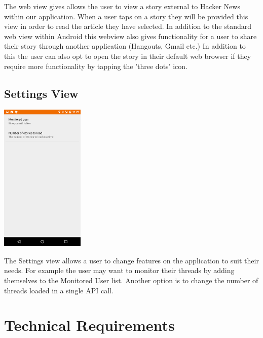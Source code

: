 \documentclass[11pt]{article}
\begin{document}
The web view gives allows the user to view a story external to Hacker News within our application. When a user taps on a story they will be provided this view in order to read the article they have selected. In addition to the standard web view within Android this webview also gives functionality for a user to share their story through another application (Hangouts, Gmail etc.) In addition to this the user can also opt to open the story in their default web browser if they require more functionality by tapping the 'three dots' icon.

\subsection*{Settings View}

\begin{center}
\includegraphics[width=0.3\textwidth]{settings.png}
\end{center}

The Settings view allows a user to change features on the application to suit their needs. For example the user may want to monitor their threads by adding themselves to the Monitored User list. Another option is to change the number of threads loaded in a single API call.

\section*{Technical Requirements}
\end{document}
